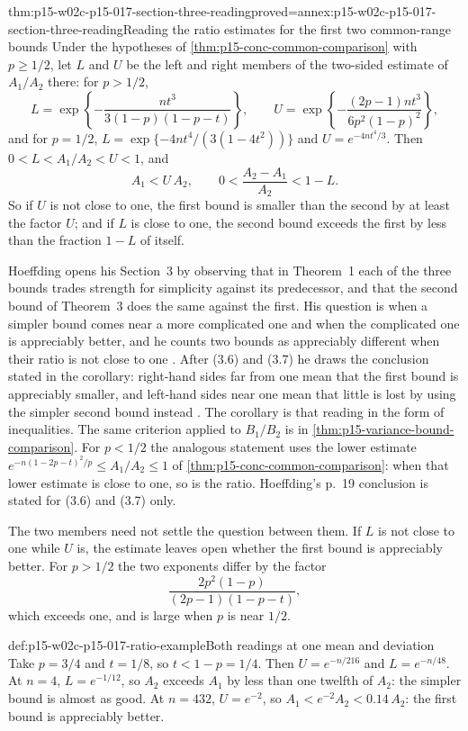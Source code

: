 \begin{hbcorollary}{thm:p15-w02c-p15-017-section-three-reading}{proved=annex:p15-w02c-p15-017-section-three-reading}{Reading the ratio estimates for the first two common-range bounds}
Under the hypotheses of \cref{thm:p15-conc-common-comparison} with
\(p\geq1/2\), let \(L\) and \(U\) be the left and right members of the
two-sided estimate of \(A_1/A_2\) there: for \(p>1/2\),
\[
 L=\exp\!\left\{-\frac{nt^3}{3(1-p)(1-p-t)}\right\},\qquad
 U=\exp\!\left\{-\frac{(2p-1)nt^3}{6p^2(1-p)^2}\right\},
\]
and for \(p=1/2\), \(L=\exp\{-4nt^4/(3(1-4t^2))\}\) and
\(U=e^{-4nt^4/3}\). Then \(0<L<A_1/A_2<U<1\), and
\[
 A_1<U\,A_2,\qquad 0<\frac{A_2-A_1}{A_2}<1-L .
\]
So if \(U\) is not close to one, the first bound is smaller than the
second by at least the factor \(U\); and if \(L\) is close to one, the
second bound exceeds the first by less than the fraction \(1-L\) of
itself.
\end{hbcorollary}

Hoeffding opens his Section~3 by observing that in Theorem~1 each of the
three bounds trades strength for simplicity against its predecessor, and
that the second bound of Theorem~3 does the same against the first. His
question is when a simpler bound comes near a more complicated one and
when the complicated one is appreciably better, and he counts two bounds
as appreciably different when their ratio is not close to one
\cite[p.~18]{Hoeffding1963BoundedSums}. After (3.6) and (3.7) he draws
the conclusion stated in the corollary: right-hand sides far from one
mean that the first bound is appreciably smaller, and left-hand sides near
one mean that little is lost by using the simpler second bound instead
\cite[p.~19]{Hoeffding1963BoundedSums}.
The corollary is that reading in the form of inequalities. The same
criterion applied to \(B_1/B_2\) is in
\cref{thm:p15-variance-bound-comparison}. For \(p<1/2\) the analogous
statement uses the lower estimate \(e^{-n(1-2p-t)^2/p}\leq A_1/A_2\leq1\)
of \cref{thm:p15-conc-common-comparison}: when that lower estimate is
close to one, so is the ratio. Hoeffding's p.~19 conclusion is stated for
(3.6) and (3.7) only.

The two members need not settle the question between them. If \(L\) is
not close to one while \(U\) is, the estimate leaves open whether the
first bound is appreciably better. For \(p>1/2\) the two exponents differ
by the factor
\[
 \frac{2p^2(1-p)}{(2p-1)(1-p-t)},
\]
which exceeds one, and is large when \(p\) is near \(1/2\).

\begin{hbexample}{def:p15-w02c-p15-017-ratio-example}{Both readings at one mean and deviation}
Take \(p=3/4\) and \(t=1/8\), so \(t<1-p=1/4\). Then
\(U=e^{-n/216}\) and \(L=e^{-n/48}\). At \(n=4\), \(L=e^{-1/12}\), so
\(A_2\) exceeds \(A_1\) by less than one twelfth of \(A_2\): the simpler
bound is almost as good. At \(n=432\), \(U=e^{-2}\), so
\(A_1<e^{-2}A_2<0.14\,A_2\): the first bound is appreciably better.
\end{hbexample}

